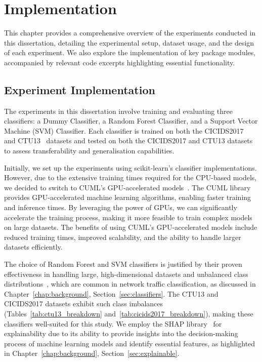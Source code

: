 \chapter{Implementation}\label{chap:implementation}

This chapter provides a comprehensive overview of the experiments conducted in this dissertation, detailing the experimental setup, dataset usage, and the design of each experiment. We also explore the implementation of key package modules, accompanied by relevant code excerpts highlighting essential functionality.

\section{Experiment Implementation}\label{sec:ExperimentImplementation}

The experiments in this dissertation involve training and evaluating three classifiers: a Dummy Classifier, a Random Forest Classifier, and a Support Vector Machine (SVM) Classifier. Each classifier is trained on both the CICIDS2017~\cite{sharafaldin2018toward} and CTU13~\cite{garcia2014empirical} datasets and tested on both the CICIDS2017 and CTU13 datasets to assess transferability and generalisation capabilities.

Initially, we set up the experiments using scikit-learn's classifier implementations. However, due to the extensive training times required for the CPU-based models, we decided to switch to CUML's GPU-accelerated models~\cite{raschka2020machine}. The CUML library provides GPU-accelerated machine learning algorithms, enabling faster training and inference times. By leveraging the power of GPUs, we can significantly accelerate the training process, making it more feasible to train complex models on large datasets. The benefits of using CUML's GPU-accelerated models include reduced training times, improved scalability, and the ability to handle larger datasets efficiently.

The choice of Random Forest and SVM classifiers is justified by their proven effectiveness in handling large, high-dimensional datasets and unbalanced class distributions~\cite{farnaaz2016random, teng2017svm}, which are common in network traffic classification, as discussed in Chapter~\ref{chap:background}, Section~\ref{sec:classifiers}. The CTU13 and CICIDS2017 datasets exhibit such class imbalances (Tables~\ref{tab:ctu13_breakdown} and~\ref{tab:cicids2017_breakdown}), making these classifiers well-suited for this study. We employ the SHAP library~\cite{lundberg2017unified} for explainability due to its ability to provide insights into the decision-making process of machine learning models and identify essential features, as highlighted in Chapter~\ref{chap:background}, Section~\ref{sec:explainable}.

